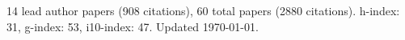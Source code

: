 14 lead author papers (908 citations),
60 total papers (2880 citations).\newline
h-index: 31, g-index: 53, i10-index: 47. Updated \today.
